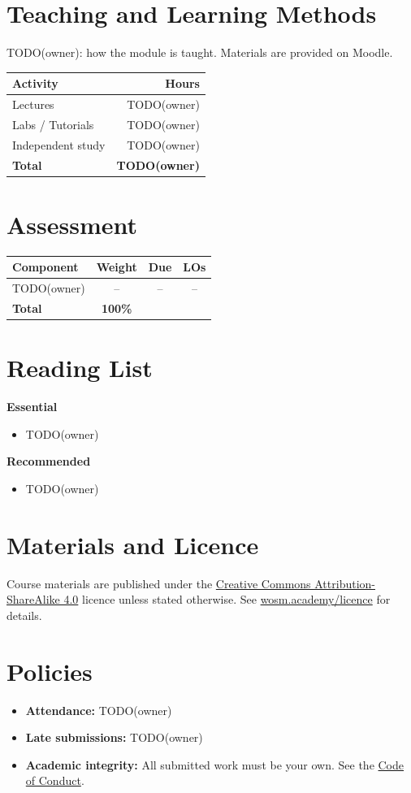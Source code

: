 \documentclass[11pt,a4paper]{article}
\begin{document}
\section{Teaching and Learning Methods}
TODO(owner): how the module is taught. Materials are provided on Moodle.

\begin{tabularx}{0.6\textwidth}{X r}
\toprule
\textbf{Activity} & \textbf{Hours} \\
\midrule
Lectures            & TODO(owner) \\
Labs / Tutorials    & TODO(owner) \\
Independent study   & TODO(owner) \\
\midrule
\textbf{Total}      & \textbf{TODO(owner)} \\
\bottomrule
\end{tabularx}

\section{Assessment}
\begin{tabularx}{\textwidth}{X c c c}
\toprule
\textbf{Component} & \textbf{Weight} & \textbf{Due} & \textbf{LOs} \\
\midrule
TODO(owner)         & --   & --      & -- \\
\midrule
\textbf{Total}      & \textbf{100\%} & & \\
\bottomrule
\end{tabularx}

\section{Reading List}
\textbf{Essential}
\begin{itemize}
  \item TODO(owner)
\end{itemize}
\textbf{Recommended}
\begin{itemize}
  \item TODO(owner)
\end{itemize}

\section{Materials and Licence}
Course materials are published under the
\href{https://creativecommons.org/licenses/by-sa/4.0/}{Creative Commons Attribution-ShareAlike 4.0}
licence unless stated otherwise. See \href{https://wosm.academy/licence/}{wosm.academy/licence} for details.

\section{Policies}
\begin{itemize}
  \item \textbf{Attendance:} TODO(owner)
  \item \textbf{Late submissions:} TODO(owner)
  \item \textbf{Academic integrity:} All submitted work must be your own.
        See the \href{https://wosm.academy/code-of-conduct/}{Code of Conduct}.
\end{itemize}
\end{document}
